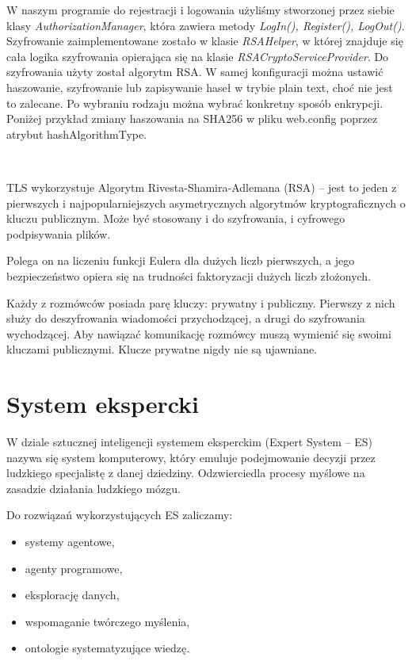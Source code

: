 \documentclass[12pt,a4paper]{article}
\begin{document}
	
	W naszym programie do rejestracji i logowania użyliśmy stworzonej przez siebie klasy \emph{AuthorizationManager}, która zawiera metody \emph{LogIn(), Register(), LogOut()}.
	Szyfrowanie zaimplementowane zostało w klasie \emph{RSAHelper}, w której znajduje się cała logika szyfrowania opierająca się na klasie \emph{RSACryptoServiceProvider}.
	Do szyfrowania użyty został algorytm RSA. W samej konfiguracji można ustawić haszowanie, szyfrowanie lub zapisywanie haseł w trybie plain text, choć nie jest to zalecane. Po wybraniu rodzaju można wybrać konkretny sposób enkrypcji. Poniżej przykład zmiany haszowania na SHA256 w pliku web.config poprzez atrybut hashAlgorithmType.
	
	\begin{lstlisting}
		
	\end{lstlisting}

	TLS wykorzystuje Algorytm Rivesta-Shamira-Adlemana (RSA) -- jest to jeden z pierwszych i najpopularniejszych asymetrycznych algorytmów kryptograficznych o kluczu publicznym. Może być stosowany i do szyfrowania, i cyfrowego podpisywania plików.
	
	\smallskip
	Polega on na liczeniu funkcji Eulera dla dużych liczb pierwszych, a jego bezpieczeństwo opiera się na trudności faktoryzacji dużych liczb złożonych.
	
	\smallskip
	Każdy z rozmówców posiada parę kluczy: prywatny i publiczny. Pierwszy z nich służy do deszyfrowania wiadomości przychodzącej, a drugi do szyfrowania wychodzącej. Aby nawiązać komunikację rozmówcy muszą wymienić się swoimi kluczami publicznymi. Klucze prywatne nigdy nie są ujawniane.
	
	
\section*{System ekspercki}

	W dziale sztucznej inteligencji systemem eksperckim (Expert System -- ES) nazywa się system komputerowy, który emuluje podejmowanie decyzji przez ludzkiego specjalistę z danej dziedziny. Odzwierciedla procesy myślowe na zasadzie działania ludzkiego mózgu.
	
	Do rozwiązań wykorzystujących ES zaliczamy:
	\begin{itemize}
		\item systemy agentowe,
		\item agenty programowe,
		\item eksplorację danych,
		\item wspomaganie twórczego myślenia,
		\item ontologie systematyzujące wiedzę.
	\end{itemize}
	\bigskip
	
\end{document}
